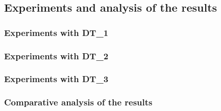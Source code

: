 \subsection{Experiments and analysis of the results}


\subsubsection{Experiments with DT\_1}
\subsubsection{Experiments with DT\_2}
\subsubsection{Experiments with DT\_3}
\subsubsection{Comparative analysis of the results}
